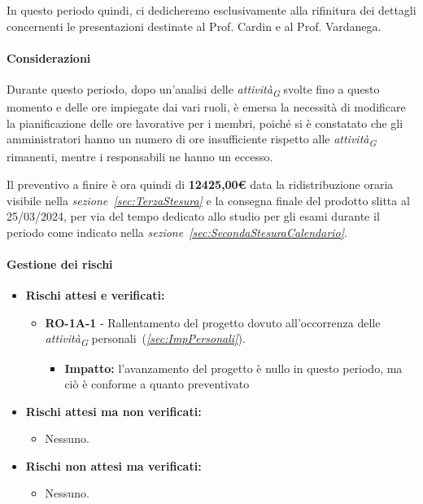 \vspace{0.2cm}

In questo periodo quindi, ci dedicheremo esclusivamente alla rifinitura dei dettagli concernenti le presentazioni destinate al Prof. Cardin e al Prof. Vardanega.

\paragraph{Considerazioni}
Durante questo periodo, dopo un'analisi delle \textit{attività}\textsubscript{\textit{G}} svolte fino a questo momento e delle ore impiegate dai vari ruoli, è emersa la necessità di modificare la pianificazione delle ore lavorative per i membri, poiché si è constatato che gli amministratori hanno un numero di ore insufficiente rispetto alle \textit{attività}\textsubscript{\textit{G}} rimanenti, mentre i responsabili ne hanno un eccesso.

\vspace{0.2cm}

Il preventivo a finire è ora quindi di \textbf{12425,00€} data la ridistribuzione oraria visibile nella \textit{sezione~\ref{sec:TerzaStesura}} e la consegna finale del prodotto slitta al 25/03/2024, per via del tempo dedicato allo studio per gli esami durante il periodo come indicato nella \textit{sezione~\ref{sec:SecondaStesuraCalendario}}. 


\paragraph{Gestione dei rischi} 
\begin{itemize}
    \item \textbf{Rischi attesi e verificati:}
\begin{itemize}
    \item \textbf{RO-1A-1} - Rallentamento del progetto dovuto all'occorrenza delle \textit{attività}\textsubscript{\textit{G}} personali~(\textit{\ref{sec:ImpPersonali}}).
    \begin{itemize}
        \item \textbf{Impatto:}
       l'avanzamento del progetto è nullo in questo periodo, ma ciò è conforme a quanto preventivato
    \end{itemize}
\end{itemize}
\item \textbf{Rischi attesi ma non verificati:}
    \begin{itemize}
        \item Nessuno.
    \end{itemize}
    \item \textbf{Rischi non attesi ma verificati:}
    \begin{itemize}
        \item Nessuno.
    \end{itemize}
\end{itemize}
\newpage
